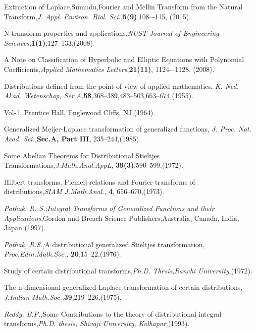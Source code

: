 \begin{thebibliography}{00}
Extraction of Laplace,Sumudu,Fourier
and Mellin Transform from the Natural Transform,{\it J. Appl. Environ. Biol. Sci.,}{\bf 5(9)},108–-115, (2015).

N-transform properties and applications,{\it NUST Journal of Engineering Sciences,}{\bf 1(1)},127--133,(2008).


A Note on Classification of Hyperbolic and Elliptic
Equations with Polynomial Coefficients,{\it Applied Mathematics Letters},{\bf 21(11)}, 1124-–1128, (2008).

Distributions defined from the point of view of applied mathematics, {\it K. Ned. Akad. Wetenschap, Ser.A,}{\bf 58},368--389,483--503,663--674,(1955).


 Vol-1, Prentice Hall, Englewood Cliffs, NJ,(1964).

 Generalized Meijer-Laplace transformation of generalized functions, {\it J. Proc. Nat. Acad. Sci.,}{\bf Sec.A, Part III}, 235--244,(1985).

Some Abelian Theorems for Distributional Stieltjes Transformations,{\it J.Math.Anal.AppL,} {\bf 39(3)},590--599,(1972).

 Hilbert transforms, Plemelj relations and Fourier transforms of distributions,{\it SIAM J.Math.Anal., }{\bf 4}, 656--670,(1973).

 {\sl Pathak, R. S.;}{\it Integral Transforms of Generalized Functions and their Applications},Gordon and Breach Science Publishers,Australia, Canada, India, Japan (1997).

 {\sl Pathak, R.S.;}A distributional generalized Stieltjes transformation, {\it Proc.Edin.Math.Soc.,} {\bf 20},15--22,(1976).

Study of certain distributional transforms,{\it Ph.D. Thesis,Ranchi University},(1972).

The n-dimensional generalized Laplace transformation of certain distributions, {\it J.Indian Math.Soc.,}{\bf 39},219--226,(1975).

 {\sl Reddy, B.P.;}Some Contributions to the theory of distributional integral transforms,{\it Ph.D. thesis, Shivaji University, Kolhapur},(1993).


\end{thebibliography}
